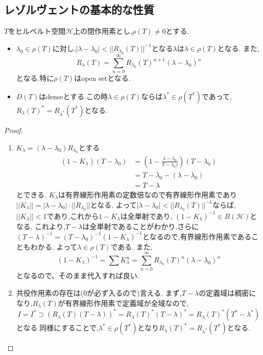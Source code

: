 \documentclass[uplatex]{jsbook}
\begin{document}
\subsection{レゾルヴェントの基本的な性質}
\begin{thm}
 $T$をヒルベルト空間$\mathcal{H}$上の閉作用素とし,$\rho(T) \neq 0$とする.
 \begin{itemize}
   \item $\lambda_0 \in \rho(T)$に対し,$|\lambda - \lambda_0|< ||R_{\lambda_0}(T) ||^{-1}$となる$\lambda$は$\lambda \in \rho(T)$となる.
   また,
   \begin{equation*}
   R_{\lambda}(T) = \sum_{n=0} ^{\infty} R_{\lambda_0}(T)^{n+1}(\lambda - \lambda_0)^n
   \end{equation*}
   となる.特に$\rho(T)$はopen setとなる.
   \item $D(T)$はdenseとする.この時$\lambda \in \rho(T)$ならば$\lambda^* \in \rho(T^*)$であって,$R_{\lambda}(T)^* = R_{\lambda^*}(T^*)$となる.
 \end{itemize}
\end{thm}
\begin{proof}
  \begin{enumerate}
    \item
$K_{\lambda} = (\lambda - \lambda_0)R_{\lambda_0}$とする
\begin{align*}
(1- K_{\lambda})(T - \lambda_0) & =  (1- \frac{\lambda - \lambda_0}{T - \lambda_0)} ) (T -\lambda_0) \\
    & = T - \lambda_0 - (\lambda - \lambda_0)  \\
    & = T - \lambda
\end{align*}
とできる.
$K_{\lambda}$は有界線形作用素の定数倍なので有界線形作用素であり$||K_{\lambda}|| = |\lambda - \lambda_0|\cdot ||R_{\lambda_0}||$となる.
よって$|\lambda - \lambda_0| < ||R_{\lambda_0}(T)||^{-1}$ならば,$||K_{\lambda}|| < 1$であり,これから$1-K_{\lambda}$は全単射であり,
$(1-K_{\lambda})^{-1} \in B(\mathcal{H})$となる.
これより,$T-\lambda$は全単射であることがわかり,さらに$(T-\lambda)^{-1} = (T - \lambda_0)^{-1}(1-K_{\lambda})^{-1}$となるので,有界線形作用素であることもわかる.
よって$\lambda \in \rho(T)$である.
また,
\begin{equation*}
  (1-K_{\lambda})^{-1}= \sum K^n_{\lambda} = \sum_{n=0}^{\infty} R_{\lambda_0}(T)^n(\lambda - \lambda_0)^n
\end{equation*}
となるので、そのまま代入すれば良い.

\item  共役作用素の存在は(0が必ず入るので)言える.
まず,$T-\lambda$の定義域は稠密になり,$R_{\lambda}(T)$が有界線形作用素で定義域が全域なので,
\begin{equation*}
I = I ^* \supset (R_{\lambda}(T)(T - \lambda))^* =  R_{\lambda}(T)^* (T-\lambda)^* = R_{\lambda}(T)^* (T^* - \lambda^*)
\end{equation*}
となる.同様にすることで,$\lambda^* \in \rho(T^*)$となり$R_{\lambda}(T)^* = R_{\lambda^*}(T^*)$となる.
\end{enumerate}
\end{proof}
\end{document}

